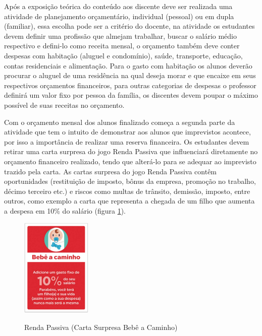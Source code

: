 Após a exposição teórica do conteúdo aos discente deve ser realizada uma atividade de planejamento orçamentário, individual (pessoal) ou em dupla (familiar), essa escolha pode ser a critério do docente, na atividade os estudantes devem definir uma profissão que almejam trabalhar, buscar o salário médio respectivo e defini-lo como receita mensal, o orçamento também deve conter despesas com habitação (aluguel e condomínio), saúde, transporte, educação, contas residenciais e alimentação. Para o gasto com habitação os alunos deverão procurar o aluguel de uma residência na qual deseja morar e que encaixe em seus respectivos orçamentos financeiros, para outras categorias de despesas o professor definirá um valor fixo por pessoa da família, os discentes devem poupar o máximo possível de suas receitas no orçamento.

Com o orçamento mensal dos alunos finalizado começa a segunda parte da atividade que tem o intuito de demonstrar aos alunos que imprevistos acontece, por isso a importância de realizar uma reserva financeira. Os estudantes devem retirar uma carta surpresa do jogo Renda Passiva que influenciará diretamente no orçamento financeiro realizado, tendo que alterá-lo para se adequar ao imprevisto trazido pela carta. As cartas surpresa do jogo Renda Passiva contêm oportunidades (restituição de imposto, bônus da empresa, promoção no trabalho, décimo terceiro etc.) e riscos como multas de trânsito, demissão, imposto, entre outros, como exemplo a carta que representa a chegada de um filho que aumenta a despesa em 10\% do salário (figura \ref{fig: fig16-carta-bebe}).

\graphicspath{{figuras/}} 
\begin{figure}[!ht]
\centering
\begin{minipage}{1.\textwidth}
\caption{Renda Passiva (Carta Surpresa Bebê a Caminho)}
\centering
\includegraphics[width=0.3\textwidth]{fig16-carta-bebe}
\label{fig: fig16-carta-bebe}
\end{minipage}
\end{figure}


